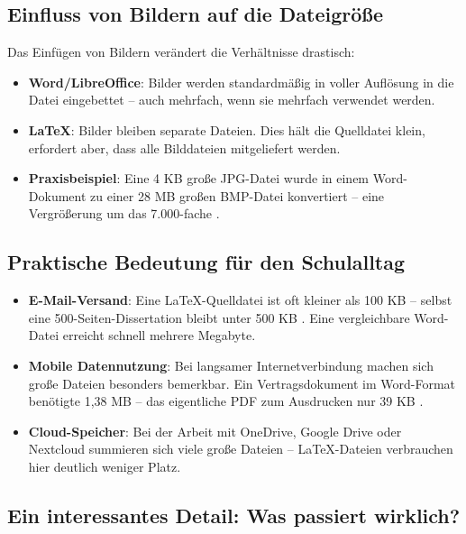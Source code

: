 \documentclass[a4paper,12pt]{article}
\begin{document}
	\subsection{Einfluss von Bildern auf die Dateigröße}
	
	Das Einfügen von Bildern verändert die Verhältnisse drastisch:
	
	\begin{itemize}
		\item \textbf{Word/LibreOffice}: Bilder werden standardmäßig in voller Auflösung in die Datei eingebettet – auch mehrfach, wenn sie mehrfach verwendet werden.
		\item \textbf{\LaTeX}: Bilder bleiben separate Dateien. Dies hält die Quelldatei klein, erfordert aber, dass alle Bilddateien mitgeliefert werden.
		\item \textbf{Praxisbeispiel}: Eine 4 KB große JPG-Datei wurde in einem Word-Dokument zu einer 28 MB großen BMP-Datei konvertiert – eine Vergrößerung um das 7.000-fache \cite{libreoffice-bild-komprimierung}.
	\end{itemize}
	
	\subsection{Praktische Bedeutung für den Schulalltag}
	
	\begin{itemize}
		\item \textbf{E-Mail-Versand}: Eine \LaTeX-Quelldatei ist oft kleiner als 100 KB – selbst eine 500-Seiten-Dissertation bleibt unter 500 KB \cite{gnutls-100-pages}. Eine vergleichbare Word-Datei erreicht schnell mehrere Megabyte.
		\item \textbf{Mobile Datennutzung}: Bei langsamer Internetverbindung machen sich große Dateien besonders bemerkbar. Ein Vertragsdokument im Word-Format benötigte 1,38 MB – das eigentliche PDF zum Ausdrucken nur 39 KB \cite{wendl-download}.
		\item \textbf{Cloud-Speicher}: Bei der Arbeit mit OneDrive, Google Drive oder Nextcloud summieren sich viele große Dateien – \LaTeX-Dateien verbrauchen hier deutlich weniger Platz.
	\end{itemize}
	
	\subsection{Ein interessantes Detail: Was passiert wirklich?}
	
\end{document}

